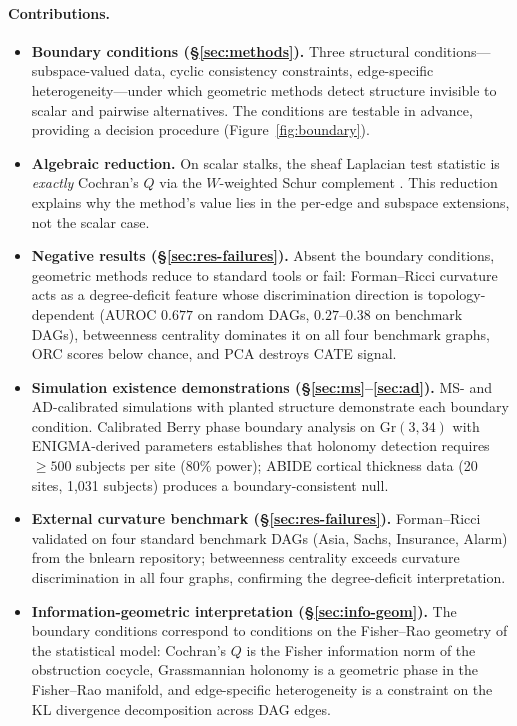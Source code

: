 \documentclass[11pt]{article}
\newcommand{\Gr}{\mathrm{Gr}}
\begin{document}
\paragraph{Contributions.}
\begin{itemize}
\item \textbf{Boundary conditions (\S\ref{sec:methods}).} Three structural conditions---subspace-valued data, cyclic consistency constraints, edge-specific heterogeneity---under which geometric methods detect structure invisible to scalar and pairwise alternatives. The conditions are testable in advance, providing a decision procedure (Figure~\ref{fig:boundary}).
\item \textbf{Algebraic reduction.} On scalar stalks, the sheaf Laplacian test statistic is \emph{exactly} Cochran's $Q$ via the $W$-weighted Schur complement \citep{tower2026sheaf}. This reduction explains why the method's value lies in the per-edge and subspace extensions, not the scalar case.
\item \textbf{Negative results (\S\ref{sec:res-failures}).} Absent the boundary conditions, geometric methods reduce to standard tools or fail: Forman--Ricci curvature acts as a degree-deficit feature whose discrimination direction is topology-dependent (AUROC $0.677$ on random DAGs, $0.27$--$0.38$ on benchmark DAGs), betweenness centrality dominates it on all four benchmark graphs, ORC scores below chance, and PCA destroys CATE signal.
\item \textbf{Simulation existence demonstrations (\S\ref{sec:ms}--\ref{sec:ad}).} MS- and AD-calibrated simulations with planted structure demonstrate each boundary condition. Calibrated Berry phase boundary analysis on $\Gr(3,34)$ with ENIGMA-derived parameters establishes that holonomy detection requires $\geq 500$ subjects per site (80\% power); ABIDE cortical thickness data (20 sites, 1{,}031 subjects) produces a boundary-consistent null.
\item \textbf{External curvature benchmark (\S\ref{sec:res-failures}).} Forman--Ricci validated on four standard benchmark DAGs (Asia, Sachs, Insurance, Alarm) from the bnlearn repository; betweenness centrality exceeds curvature discrimination in all four graphs, confirming the degree-deficit interpretation.
\item \textbf{Information-geometric interpretation (\S\ref{sec:info-geom}).} The boundary conditions correspond to conditions on the Fisher--Rao geometry of the statistical model: Cochran's $Q$ is the Fisher information norm of the obstruction cocycle, Grassmannian holonomy is a geometric phase in the Fisher--Rao manifold, and edge-specific heterogeneity is a constraint on the KL divergence decomposition across DAG edges.
\end{itemize}
\end{document}
